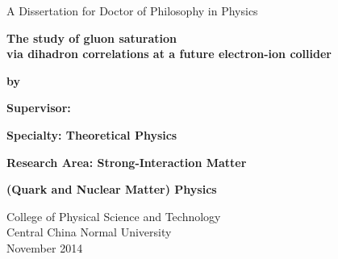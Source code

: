 \mbox{}\vskip 0.8cm
\begin{center}
{\Large A Dissertation for Doctor of Philosophy in Physics}
\end{center}
\vspace{0.22in}
\begin{center} {\LARGE \textbf{The study of gluon saturation \\ via dihadron correlations at a future electron-ion collider}}
\end{center}
\vspace{0.22in}

\begin{center}
\bfseries{
{\Large  by \\ %
\vskip 0.22in  \vskip 0.4in }
}
\end{center}


\mbox{}\hskip 0.3cm{\Large { \bfseries Supervisor:  %
} }

\mbox{}\hskip 0.3cm{\Large { \bfseries Specialty:  Theoretical Physics} }

\mbox{}\hskip 0.3cm{\Large { \bfseries Research Area: Strong-Interaction Matter } }

\mbox{}\hskip 0.3cm{\Large { \bfseries (Quark and Nuclear Matter) Physics} }

\vskip 1.55in


\begin{center}
{\Large
College of Physical Science and Technology \\
Central \hskip 0.2cm China \hskip 0.2cm Normal \hskip 0.2cm University \\ 
\vskip 0.22cm November \hskip 0.2cm 2014 }
\end{center}

\clearpage
